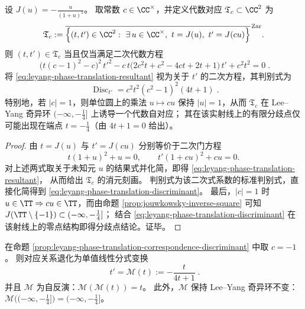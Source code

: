 \begin{proposition}\label{prop:leyang-phase-translation-correspondence-discriminant}
设 \(J(u)=-\frac{u}{(1+u)^2}\)。
取常数 \(c\in\CC^{\times}\)，并定义代数对应 \(\mathfrak{T}_c\subset\CC^2\) 为
\[
\mathfrak{T}_c
:=
\overline{
\Bigl\{(t,t')\in\CC^2:\ \exists\,u\in\CC^{\times},\ t=J(u),\ t'=J(cu)\Bigr\}
}^{\,\mathrm{Zar}}.
\]
则 \((t,t')\in\mathfrak{T}_c\) 当且仅当满足二次代数方程
\begin{equation}\label{eq:leyang-phase-translation-resultant}
\boxed{\;
\bigl(t(c-1)^2-c\bigr)^2\,t'^2
-c\,t\bigl(2c^2t+c^2-4ct+2t+1\bigr)\,t'
+c^2t^2
=0\; }.
\end{equation}
将 \eqref{eq:leyang-phase-translation-resultant} 视为关于 \(t'\) 的二次方程，其判别式为
\begin{equation}\label{eq:leyang-phase-translation-discriminant}
\boxed{\;
\operatorname{Disc}_{t'}
=c^2t^2(c^2-1)^2(4t+1)\; }.
\end{equation}
特别地，若 \(|c|=1\)，则单位圆上的乘法 \(u\mapsto cu\) 保持 \(|u|=1\)，从而 \(\mathfrak{T}_c\) 在 Lee--Yang 奇异环 \((-\infty,-\tfrac14]\) 上诱导一个代数自对应；
其在该实射线上的有限分歧点仅可能出现在端点 \(t=-\tfrac14\)（由 \(4t+1=0\) 给出）。
\end{proposition}

\begin{proof}
由 \(t=J(u)\) 与 \(t'=J(cu)\) 分别等价于二次门方程
\[
t(1+u)^2+u=0,
\qquad
t'(1+cu)^2+cu=0.
\]
对上述两式取关于未知元 \(u\) 的结果式并化简，即得 \eqref{eq:leyang-phase-translation-resultant}，
从而给出 \(\mathfrak{T}_c\) 的消元刻画。
判别式为该二次式系数的标准判别式，直接化简得到 \eqref{eq:leyang-phase-translation-discriminant}。
最后，\(|c|=1\) 时 \(u\in\TT\Rightarrow cu\in\TT\)，而由命题 \ref{prop:jouwkowsky-inverse-square} 可知 \(J(\TT\setminus\{-1\})\subset(-\infty,-\tfrac14]\)；
结合 \eqref{eq:leyang-phase-translation-discriminant} 在该射线上的零点结构即得分歧点结论。证毕。
\end{proof}

\begin{corollary}\label{cor:leyang-quarterphase-mobius-involution}
在命题 \ref{prop:leyang-phase-translation-correspondence-discriminant} 中取 \(c=-1\)。
则对应关系退化为单值线性分式变换
\begin{equation}\label{eq:leyang-mobius-involution}
\boxed{\;
t'=\mathscr{M}(t):=-\frac{t}{4t+1}\; }.
\end{equation}
并且 \(\mathscr{M}\) 为自反演：\(\mathscr{M}(\mathscr{M}(t))=t\)。
此外，\(\mathscr{M}\) 保持 Lee--Yang 奇异环不变：\(\mathscr{M}\bigl((-\infty,-\tfrac14]\bigr)=(-\infty,-\tfrac14]\)。
\end{corollary}

